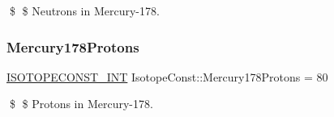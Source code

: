 \$ \$ Neutrons in Mercury-\/178. \mbox{\label{group___isotope_const-_mercury-_hg178_ga1e67bd41c1de3361e07464f6408b9834}} 
\subsubsection{\texorpdfstring{Mercury178\+Protons}{Mercury178Protons}}
{\footnotesize\ttfamily \mbox{\hyperlink{group___isotope_const-_macros_ga5f18360b3e99483a35c32d789e62621c}{I\+S\+O\+T\+O\+P\+E\+C\+O\+N\+S\+T\+\_\+\+I\+NT}} Isotope\+Const\+::\+Mercury178\+Protons = 80}

\$ \$ Protons in Mercury-\/178. 